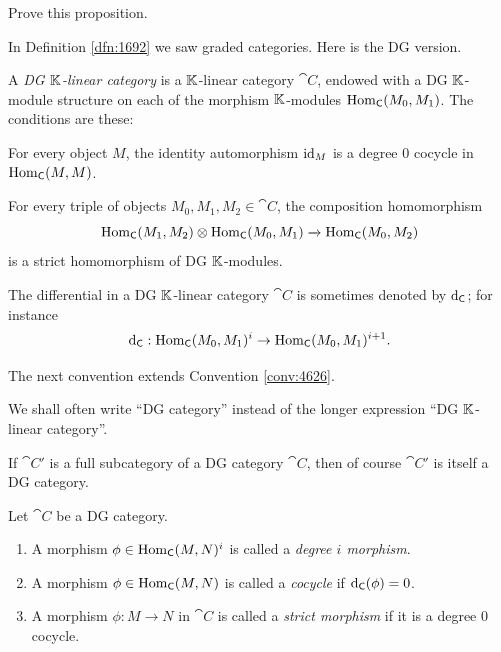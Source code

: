 \begin{exer} \label{exer:4130}
Prove this proposition. 
\end{exer}





 \label{susec:DGCats}

In Definition \ref{dfn:1692} we saw graded categories. Here is the DG version. 
 
\begin{dfn} \label{dfn:1063}
A {\em DG $\mathbb{K}$-linear category}
is a $\mathbb{K}$-linear category $\cat{C}$, endowed 
with a DG $\mathbb{K}$-module structure on each of the morphism $\mathbb{K}$-modules 
$\operatorname{Hom}_{\operatorname{\mathsf{C}}}(M_0, M_1)$. The conditions are these:
\begin{itemize}
 For every object $M$, the identity automorphism $\operatorname{id}_M$ is a 
degree $0$ cocycle in $\operatorname{Hom}_{\operatorname{\mathsf{C}}}(M, M)$. 

 For every triple of objects $M_0, M_1, M_2 \in \cat{C}$, the 
composition homomorphism 
\[ \operatorname{Hom}_{\operatorname{\mathsf{C}}}(M_1, M_2) \otimes \operatorname{Hom}_{\operatorname{\mathsf{C}}}(M_0, M_1)
\xrightarrow{} \operatorname{Hom}_{\operatorname{\mathsf{C}}}(M_0, M_2) \]
is a strict homomorphism of DG $\mathbb{K}$-modules. 
\end{itemize}
\end{dfn}

The differential in a DG $\mathbb{K}$-linear category $\cat{C}$ is sometimes denoted by 
$\mathrm{d}_{\operatorname{\mathsf{C}}}$; for instance 
\begin{equation} \label{eqn:4135}
\mathrm{d}_{\operatorname{\mathsf{C}}} : \operatorname{Hom}_{\operatorname{\mathsf{C}}}(M_0, M_1)^{i} \to 
\operatorname{Hom}_{\operatorname{\mathsf{C}}}(M_0, M_1)^{i + 1 } . 
\end{equation}

The next convention extends Convention \ref{conv:4626}. 

\begin{conv} \label{conv:4627}
We shall often write ``DG category'' instead of the longer expression
``DG $\mathbb{K}$-linear category''. 
\end{conv}

If $\cat{C}'$ is a full subcategory of a DG category $\cat{C}$, then of course
$\cat{C}'$ is itself a DG category. 

\begin{dfn} \label{dfn:1286}
Let $\cat{C}$ be a DG category.
\begin{enumerate}
\item A morphism $\phi \in \operatorname{Hom}_{\operatorname{\mathsf{C}}}(M, N)^i$
is called a {\em degree $i$ morphism}. 

\item A morphism $\phi \in \operatorname{Hom}_{\operatorname{\mathsf{C}}}(M, N)$
is called a {\em cocycle} if $\mathrm{d}_{\operatorname{\mathsf{C}}}(\phi) = 0$. 

\item A morphism $\phi : M \to N$ in $\cat{C}$ is 
called a {\em strict morphism}%
if it is a degree $0$ cocycle.
\end{enumerate}
\end{dfn}


